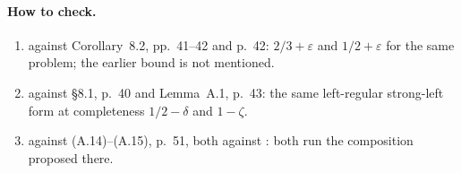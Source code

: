 \documentclass[11pt]{article}
\newcommand{\ploc}[2]{#1}
\newcommand{\sloc}[2]{\cite[#2]{#1}}
\begin{document}
\paragraph{How to check.}
\begin{enumerate}
\item \sloc{BhangaleKhot2019-UGHardnessToNPHardnessByLosingHalf}{Thm~1.4, p.~5, and its proof, p.~23}
against \ploc{Corollary~8.2, pp.~41--42}{07-consequences.tex:190--218} and
\ploc{p.~42}{07-consequences.tex:220--224}: $2/3+\varepsilon$ and
$1/2+\varepsilon$ for the same problem; the earlier bound is not mentioned.
\item \sloc{BhangaleKhot2019-UGHardnessToNPHardnessByLosingHalf}{Thm~1.2, p.~3}
against \ploc{\S8.1, p.~40}{07-consequences.tex:49--54} and
\ploc{Lemma~A.1, p.~43}{finite-consequences.tex:22--34}: the same
left-regular strong-left form at completeness $1/2-\delta$ and $1-\zeta$.
\item \sloc{BhangaleKhot2019-UGHardnessToNPHardnessByLosingHalf}{Figure~4, p.~22, and Lemma~5.3, pp.~21--22}
against \ploc{(A.14)--(A.15), p.~51}{finite-consequences.tex:669--705}, both
against
\sloc{GuruswamiEtAl2011-BeatingRandomOrderingIsHard}{Conj.~3.8, p.~14; \S7.1, pp.~20--21}:
both run the composition proposed there.
\end{enumerate}

\space%
\end{document}
